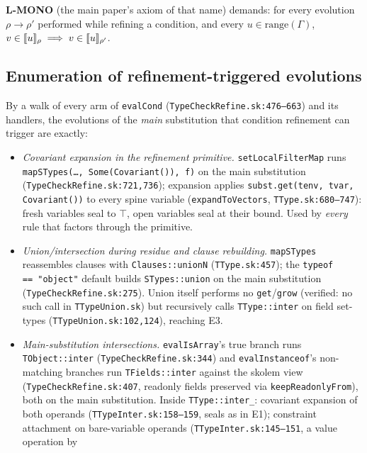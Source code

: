 \documentclass[11pt]{article}
\newcommand{\Env}{\Gamma}
\begin{document}
\textbf{L-MONO} (the main paper's axiom of that name) demands: for every
evolution
$\rho \to \rho'$ performed while refining a condition, and every
$u \in \mathrm{range}(\Env)$,
$v \in \llbracket u \rrbracket_\rho \implies v \in \llbracket u \rrbracket_{\rho'}$.

\subsection{Enumeration of refinement-triggered evolutions}
\label{sec:lmono-enum}

By a walk of every arm of \texttt{evalCond}
(\texttt{TypeCheckRefine.sk:476--663}) and its handlers, the evolutions of
the \emph{main} substitution that condition refinement can trigger are
exactly:

\begin{itemize}
\item[\textbf{(E1)}] \emph{Covariant expansion in the refinement
  primitive.} \texttt{setLocalFilterMap} runs
  \texttt{mapSTypes(\ldots, Some(Covariant()), f)} on the main
  substitution (\texttt{TypeCheckRefine.sk:721,736}); expansion applies
  \texttt{subst.get(tenv, tvar, Covariant())} to every spine variable
  (\texttt{expandToVectors}, \texttt{TType.sk:680--747}): fresh variables
  seal to $\top$, open variables
  seal at their bound. Used by \emph{every} rule that factors through the
  primitive.
\item[\textbf{(E2)}] \emph{Union/intersection during residue and clause
  rebuilding.} \texttt{mapSTypes} reassembles clauses with
  \texttt{Clauses::unionN} (\texttt{TType.sk:457}); the
  \texttt{typeof\,==\,"object"} default builds
  \texttt{STypes::union} on the main substitution
  (\texttt{TypeCheckRefine.sk:275}). Union itself performs no
  \texttt{get}/\texttt{grow} (verified: no such call in
  \texttt{TTypeUnion.sk}) but recursively calls \texttt{TType::inter} on
  field set-types (\texttt{TTypeUnion.sk:102,124}), reaching E3.
\item[\textbf{(E3)}] \emph{Main-substitution intersections.}
  \texttt{evalIsArray}'s true branch runs \texttt{TObject::inter}
  (\texttt{TypeCheckRefine.sk:344}) and \texttt{evalInstanceof}'s
  non-matching branches run \texttt{TFields::inter} against the skolem
  view (\texttt{TypeCheckRefine.sk:407}, readonly fields preserved via
  \texttt{keepReadonlyFrom}), both on the main substitution. Inside
  \texttt{TType::inter\_}: covariant expansion of both operands
  (\texttt{TTypeInter.sk:158--159}, seals as in E1); constraint
  attachment on bare-variable operands
  (\texttt{TTypeInter.sk:145--151}, a value operation by

\end{itemize}
\end{document}
